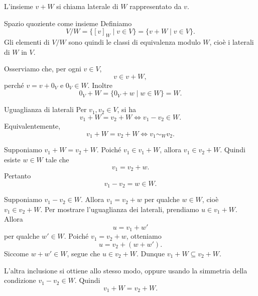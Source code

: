 \documentclass[a4paper]{article}
\begin{document}
\begin{radioactive}
L'insieme \(v+W\) si chiama laterale di \(W\) rappresentato da \(v\).
\end{radioactive}

\begin{radioactive}
\begin{snippetdefinition}{Spazio quoziente come insieme}
    Definiamo
    \[
        V/W
        =
        \{[v]_W \mid v \in V\}
        =
        \{v+W \mid v \in V\}.
    \]
    Gli elementi di \(V/W\) sono quindi le classi di equivalenza modulo \(W\), cioè i laterali di \(W\) in \(V\).
\end{snippetdefinition}
\end{radioactive}

\begin{radioactive}
Osserviamo che, per ogni \(v \in V\),
\[
    v \in v+W,
\]
perché \(v=v+0_V\) e \(0_V \in W\). Inoltre
\[
    0_V+W
    =
    \{0_V+w \mid w \in W\}
    =
    W.
\]
\end{radioactive}

\begin{radioactive}
\begin{snippetproposition}{Uguaglianza di laterali}
    Per \(v_1,v_2 \in V\), si ha
    \[
        v_1+W = v_2+W
        \iff
        v_1-v_2 \in W.
    \]
    Equivalentemente,
    \[
        v_1+W = v_2+W
        \iff
        v_1 \sim_W v_2.
    \]
\end{snippetproposition}
\end{radioactive}

\begin{radioactive}
\begin{snippetproof}{}
    \begin{iffproof}
        \item  Supponiamo \(v_1+W=v_2+W\). Poiché \(v_1 \in v_1+W\), allora \(v_1 \in v_2+W\).
        Quindi esiste \(w \in W\) tale che
        \[
            v_1 = v_2+w.
        \]
        Pertanto
        \[
            v_1-v_2 = w \in W.
        \]
        \item Supponiamo \(v_1-v_2 \in W\).
        Allora \(v_1=v_2+w\) per qualche \(w \in W\), cioè \(v_1 \in v_2+W\).
        Per mostrare l'uguaglianza dei laterali, prendiamo \(u \in v_1+W\).
        Allora
        \[
            u=v_1+w'
        \]
        per qualche \(w' \in W\). Poiché \(v_1=v_2+w\), otteniamo
        \[
            u=v_2+(w+w').
        \]
        Siccome \(w+w' \in W\), segue che \(u \in v_2+W\).
        Dunque \(v_1+W \subseteq v_2+W\).

        L'altra inclusione si ottiene allo stesso modo, oppure usando la simmetria della condizione \(v_1-v_2 \in W\).
        Quindi
        \[
            v_1+W=v_2+W.
        \]
    \end{iffproof}
\end{snippetproof}
\end{radioactive}
\end{document}

